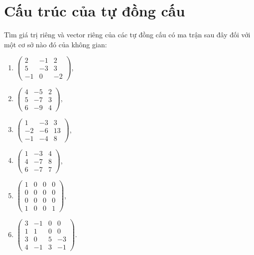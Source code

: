 \documentclass[class=linearalgebra,crop=false]{standalone}
\begin{document}
\chapter{Cấu trúc của tự đồng cấu}

\begin{exercise}
    \par Tìm giá trị riêng và vector riêng của các tự đồng cấu có ma trận sau đây đối với một cơ sở nào đó của không gian:
    \begin{enumerate}[label = (\alph*)]
        \item $
                  \begin{pmatrix}
                      2  & -1 & 2  \\
                      5  & -3 & 3  \\
                      -1 & 0  & -2
                  \end{pmatrix}
              $,
        \item $
                  \begin{pmatrix}
                      4 & -5 & 2 \\
                      5 & -7 & 3 \\
                      6 & -9 & 4
                  \end{pmatrix}
              $,
        \item $
                  \begin{pmatrix}
                      1  & -3 & 3  \\
                      -2 & -6 & 13 \\
                      -1 & -4 & 8
                  \end{pmatrix}
              $,
        \item $
                  \begin{pmatrix}
                      1 & -3 & 4 \\
                      4 & -7 & 8 \\
                      6 & -7 & 7
                  \end{pmatrix}
              $,
        \item $
                  \begin{pmatrix}
                      1 & 0 & 0 & 0 \\
                      0 & 0 & 0 & 0 \\
                      0 & 0 & 0 & 0 \\
                      1 & 0 & 0 & 1
                  \end{pmatrix}
              $,
        \item $
                  \begin{pmatrix}
                      3 & -1 & 0 & 0  \\
                      1 & 1  & 0 & 0  \\
                      3 & 0  & 5 & -3 \\
                      4 & -1 & 3 & -1
                  \end{pmatrix}
              $.
    \end{enumerate}
\end{exercise}
\end{document}
